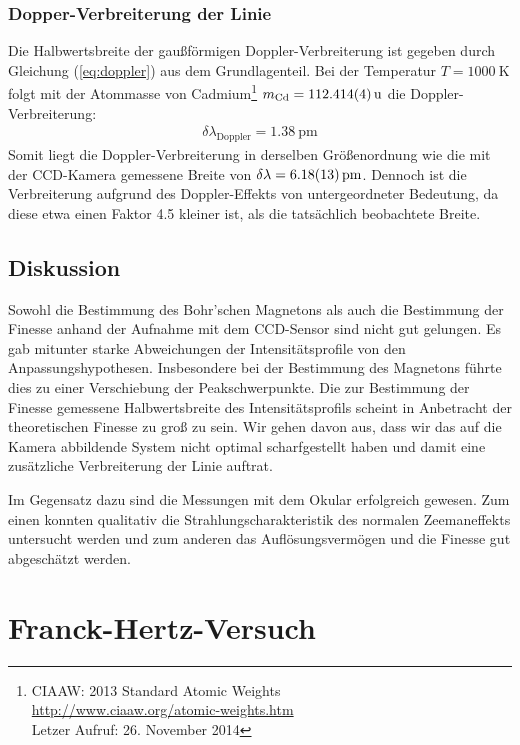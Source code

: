 \documentclass[11pt, a4paper]{article}
\begin{document}
\subsubsection{Dopper-Verbreiterung der Linie}
Die Halbwertsbreite der gaußförmigen Doppler-Verbreiterung ist gegeben durch Gleichung (\ref{eq:doppler}) aus dem Grundlagenteil.
Bei der Temperatur $T = \SI{1000}{\K}$ folgt mit der Atommasse von Cadmium\footnote{CIAAW: 2013 Standard Atomic Weights\\\url{http://www.ciaaw.org/atomic-weights.htm}\\Letzer Aufruf: 26. November 2014} $m_\mathrm{Cd} = \SI{112.414 +- 0.004}{\atomicmassunit} $ die Doppler-Verbreiterung:
\begin{align}
	\delta \lambda_\mathrm{Doppler} = \SI{1.38}{\pico\metre}
\end{align}
Somit liegt die Doppler-Verbreiterung in derselben Größenordnung wie die mit der CCD-Kamera gemessene Breite von $\delta \lambda = \SI{6.18 +- 0.13}{\pico\metre}$.
Dennoch ist die Verbreiterung aufgrund des Doppler-Effekts von untergeordneter Bedeutung, da diese etwa einen Faktor \num{4.5} kleiner ist, als die tatsächlich beobachtete Breite.

\subsection{Diskussion}
\label{ssec:diskussion_zeeman}
Sowohl die Bestimmung des Bohr'schen Magnetons als auch die Bestimmung der Finesse anhand der Aufnahme mit dem CCD-Sensor sind nicht gut gelungen.
Es gab mitunter starke Abweichungen der Intensitätsprofile von den Anpassungshypothesen.
Insbesondere bei der Bestimmung des Magnetons führte dies zu einer Verschiebung der Peakschwerpunkte.
Die zur Bestimmung der Finesse gemessene Halbwertsbreite des Intensitätsprofils scheint in Anbetracht der theoretischen Finesse zu groß zu sein.
Wir gehen davon aus, dass wir das auf die Kamera abbildende System nicht optimal scharfgestellt haben und damit eine zusätzliche Verbreiterung der Linie auftrat.

Im Gegensatz dazu sind die Messungen mit dem Okular erfolgreich gewesen.
Zum einen konnten qualitativ die Strahlungscharakteristik des normalen Zeemaneffekts untersucht werden und zum anderen das Auflösungsvermögen und die Finesse gut abgeschätzt werden.

\section{Franck-Hertz-Versuch}
\end{document}
